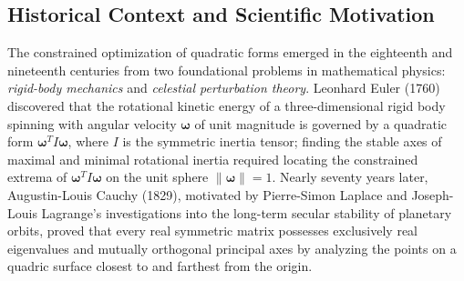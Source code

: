 \documentclass[11pt, letterpaper]{article}
\theoremstyle{definition}
\theoremstyle{remark}
\begin{document}
\begin{center}
\end{center}

\subsection{Historical Context and Scientific Motivation}

The constrained optimization of quadratic forms emerged in the eighteenth and nineteenth centuries from two foundational problems in mathematical physics: \emph{rigid-body mechanics} and \emph{celestial perturbation theory}. Leonhard Euler (1760) discovered that the rotational kinetic energy of a three-dimensional rigid body spinning with angular velocity $\boldsymbol{\omega}$ of unit magnitude is governed by a quadratic form $\boldsymbol{\omega}^T I \boldsymbol{\omega}$, where $I$ is the symmetric inertia tensor; finding the stable axes of maximal and minimal rotational inertia required locating the constrained extrema of $\boldsymbol{\omega}^T I \boldsymbol{\omega}$ on the unit sphere $\|\boldsymbol{\omega}\| = 1$. Nearly seventy years later, Augustin-Louis Cauchy (1829), motivated by Pierre-Simon Laplace and Joseph-Louis Lagrange's investigations into the long-term secular stability of planetary orbits, proved that every real symmetric matrix possesses exclusively real eigenvalues and mutually orthogonal principal axes by analyzing the points on a quadric surface closest to and farthest from the origin.
\end{document}
